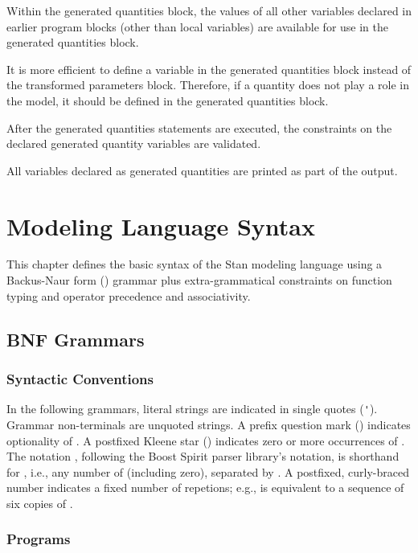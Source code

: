 Within the generated quantities block, the values of all other variables
declared in earlier program blocks (other than local variables) are
available for use in the generated quantities block.

It is more efficient to define a variable in the generated quantities
block instead of the transformed parameters block.  Therefore, if a
quantity does not play a role in the model, it should be defined in
the generated quantities block.

After the generated quantities statements are executed, the constraints
on the declared generated quantity variables are validated.

All variables declared as generated quantities are printed as part of
the output.

\chapter{Modeling Language Syntax}

\noindent
This chapter defines the basic syntax of the Stan modeling language
using a Backus-Naur form (\BNF) grammar plus extra-grammatical
constraints on function typing and operator precedence and
associativity.


\section{BNF Grammars}

\subsection{Syntactic Conventions}

In the following \BNF grammars, literal strings are indicated in
single quotes (\Verb|'|).  Grammar non-terminals are unquoted strings.
A prefix question mark () indicates optionality of .
A postfixed Kleene star () indicates zero or more occurrences
of .  The notation , following the Boost Spirit
parser library's notation, is shorthand for , i.e.,
any number of  (including zero), separated by .  A
postfixed, curly-braced number indicates a fixed number of repetions;
e.g.,  is equivalent to a sequence of six copies of .

\subsection{Programs}

